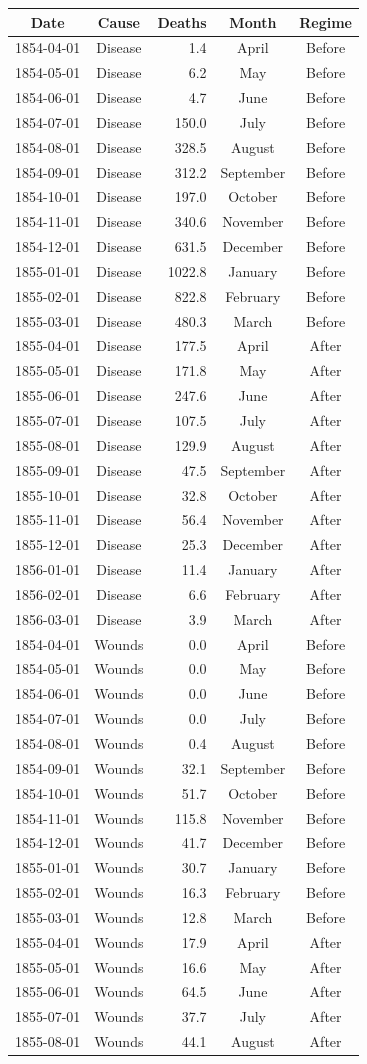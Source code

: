 \documentclass[
]{article}
\begin{document}
\begin{longtable}[]{@{}ccrcc@{}}
\toprule
Date & Cause & Deaths & Month & Regime\tabularnewline
\midrule
\endhead
1854-04-01 & Disease & 1.4 & April & Before\tabularnewline
1854-05-01 & Disease & 6.2 & May & Before\tabularnewline
1854-06-01 & Disease & 4.7 & June & Before\tabularnewline
1854-07-01 & Disease & 150.0 & July & Before\tabularnewline
1854-08-01 & Disease & 328.5 & August & Before\tabularnewline
1854-09-01 & Disease & 312.2 & September & Before\tabularnewline
1854-10-01 & Disease & 197.0 & October & Before\tabularnewline
1854-11-01 & Disease & 340.6 & November & Before\tabularnewline
1854-12-01 & Disease & 631.5 & December & Before\tabularnewline
1855-01-01 & Disease & 1022.8 & January & Before\tabularnewline
1855-02-01 & Disease & 822.8 & February & Before\tabularnewline
1855-03-01 & Disease & 480.3 & March & Before\tabularnewline
1855-04-01 & Disease & 177.5 & April & After\tabularnewline
1855-05-01 & Disease & 171.8 & May & After\tabularnewline
1855-06-01 & Disease & 247.6 & June & After\tabularnewline
1855-07-01 & Disease & 107.5 & July & After\tabularnewline
1855-08-01 & Disease & 129.9 & August & After\tabularnewline
1855-09-01 & Disease & 47.5 & September & After\tabularnewline
1855-10-01 & Disease & 32.8 & October & After\tabularnewline
1855-11-01 & Disease & 56.4 & November & After\tabularnewline
1855-12-01 & Disease & 25.3 & December & After\tabularnewline
1856-01-01 & Disease & 11.4 & January & After\tabularnewline
1856-02-01 & Disease & 6.6 & February & After\tabularnewline
1856-03-01 & Disease & 3.9 & March & After\tabularnewline
1854-04-01 & Wounds & 0.0 & April & Before\tabularnewline
1854-05-01 & Wounds & 0.0 & May & Before\tabularnewline
1854-06-01 & Wounds & 0.0 & June & Before\tabularnewline
1854-07-01 & Wounds & 0.0 & July & Before\tabularnewline
1854-08-01 & Wounds & 0.4 & August & Before\tabularnewline
1854-09-01 & Wounds & 32.1 & September & Before\tabularnewline
1854-10-01 & Wounds & 51.7 & October & Before\tabularnewline
1854-11-01 & Wounds & 115.8 & November & Before\tabularnewline
1854-12-01 & Wounds & 41.7 & December & Before\tabularnewline
1855-01-01 & Wounds & 30.7 & January & Before\tabularnewline
1855-02-01 & Wounds & 16.3 & February & Before\tabularnewline
1855-03-01 & Wounds & 12.8 & March & Before\tabularnewline
1855-04-01 & Wounds & 17.9 & April & After\tabularnewline
1855-05-01 & Wounds & 16.6 & May & After\tabularnewline
1855-06-01 & Wounds & 64.5 & June & After\tabularnewline
1855-07-01 & Wounds & 37.7 & July & After\tabularnewline
1855-08-01 & Wounds & 44.1 & August & After\tabularnewline

\end{longtable}
\end{document}
